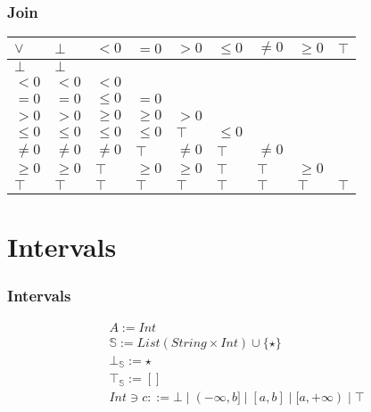 \documentclass[aspectratio=169]{beamer}
\begin{document}
                    \begin{frame}
                        \frametitle{Join}
                        \begin{table}[]
                            \begin{tabular}{|l|l|l|l|l|l|l|l|l|}
                            \hline
                            $\lor$  & $\bot$  & $<0$    & $=0$    & $>0$    & $\le 0$ & $\ne 0$ & $\ge 0$ & $\top$ \\ \hline
                            $\bot$  & $\bot$  &         &         &         &         &         &         &        \\ \hline
                            $<0$    & $<0$    & $<0$    &         &         &         &         &         &        \\ \hline
                            $=0$    & $=0$    & $\le 0$ & $=0$    &         &         &         &         &        \\ \hline
                            $>0$    & $>0$    & $\ge 0$ & $\ge 0$ & $>0$    &         &         &         &        \\ \hline
                            $\le 0$ & $\le 0$ & $\le 0$ & $\le 0$ & $\top$  & $\le 0$ &         &         &        \\ \hline
                            $\ne 0$ & $\ne 0$ & $\ne 0$ & $\top$  & $\ne 0$ & $\top$  & $\ne 0$ &         &        \\ \hline
                            $\ge 0$ & $\ge 0$ & $\top$  & $\ge 0$ & $\ge 0$ & $\top$  & $\top$  & $\ge 0$ &        \\ \hline
                            $\top$  & $\top$  & $\top$  & $\top$  & $\top$  & $\top$  & $\top$  & $\top$  & $\top$ \\ \hline
                            \end{tabular}
                            \end{table}
                    \end{frame}



\section{Intervals}

                    \begin{frame}
                        \frametitle{Intervals}
                        \begin{align*}
                            &A := Int\\
                            &\mathbb{S} := List(String \times Int) \cup \{ \star \} \\
                            &\bot_\mathbb{S} := \star \\
                            &\top_\mathbb{S} := [] \\
                            &Int \ni c ::= \bot \mid (-\infty, b] \mid [a, b] \mid [a, +\infty) \mid \top
                        \end{align*}
                    \end{frame}
                    
\end{document}
